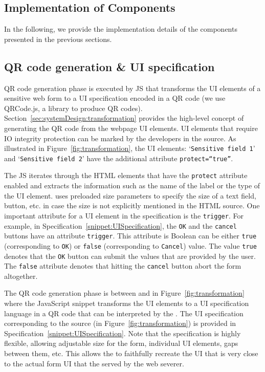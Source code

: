 \subsection{Implementation of \name Components}
\label{appendix:implementation}


In the following, we provide the implementation details of the \name components presented in the previous sections. 

\subsection{QR code generation \& UI specification}
\label{sec:prototype:impl:qr}
%
QR code generation phase is executed by \name JS that transforms the UI elements of a sensitive web form to a UI specification encoded in a QR code (we use QRCode.js, a \js library to produce QR codes). Section~\ref{sec:systemDesign:transformation} provides the high-level concept of generating the QR code from the webpage UI elements. UI elements that require IO integrity protection can be marked by the developers in the \html source. As illustrated in Figure~\ref{fig:transformation}, the \html UI elements: `\texttt{Sensitive field 1}' and `\texttt{Sensitive field 2}' have the additional attribute \texttt{protect=``true''}. %

The \name JS iterates through the HTML elements that have the \texttt{protect} attribute enabled and extracts the information such as the name of the label or the type of the UI element. \device uses preloaded size parameters to specify the size of a text field, button, etc. in case the size is not explicitly mentioned in the HTML source. One important attribute for a UI element in the specification is the \texttt{trigger}. For example, in Specification~\ref{snippet:UISpecification}, the \texttt{OK} and the \texttt{cancel} buttons have an attribute \texttt{trigger}. This attribute is Boolean can be either \texttt{true} (corresponding to \texttt{OK}) or \texttt{false} (corresponding to \texttt{Cancel}) value. The value \texttt{true} denotes that the \texttt{OK} button can submit the values that are provided by the user. The \texttt{false} attribute denotes that hitting the \texttt{cancel} button abort the form altogether. 

The QR code generation phase is between \one and \two in Figure~\ref{fig:transformation} where the \name JavaScript snippet transforms the UI elements to a UI specification language in a QR code that can be interpreted by the \device. The UI specification corresponding to the \html source (in Figure~\ref{fig:transformation}) is provided in Specification~\ref{snippet:UISpecification}. Note that the specification is highly flexible, allowing adjustable size for the form, individual UI elements, gaps between them, etc. This allows the \device to faithfully recreate the UI that is very close to the actual form UI that the served by the web severer. 

